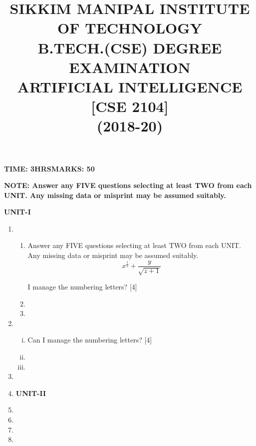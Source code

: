 \documentclass[a4paper,10pt]{article}
\title{\small{\bf SIKKIM MANIPAL INSTITUTE OF TECHNOLOGY}\\
        \small B.TECH.(CSE) DEGREE EXAMINATION\\
        ARTIFICIAL INTELLIGENCE [CSE 2104]\\
        (2018-20)}
\author{}
\date{}
\author{}
\date{}
\begin{document}
\maketitle
\vspace{-40pt}
\noindent
{\bf TIME: 3HRS}\hfill {\bf MARKS: 50}

\vspace{5pt}
\noindent
{\bf NOTE: Answer any FIVE questions selecting at least TWO from each UNIT. Any missing data or misprint may be assumed suitably.}

\begin{center}
 {\bf UNIT-I}
\end{center}
\begin{enumerate}
 \item 
 \begin{enumerate}
  \item Answer any FIVE questions selecting at least TWO from each UNIT. Any missing data or misprint may be assumed 
suitably. $$\displaystyle 
x^\frac{1}{2}+\frac{y}{\sqrt{z+1}}$$ 

I manage the numbering letters? {\hfill [4]}
   \item 
 \item
 \end{enumerate}

 \item
  \begin{enumerate}[(i)]
  \item Can I manage the numbering letters? {\hfill [4]}
   \item 
 \item
 \end{enumerate}
 \item 
 \item
 
 \noindent
 \begin{center}
 {\bf UNIT-II}
\end{center}
 \item 
 \item
 \item 
 \item
\end{enumerate}
\end{document}

